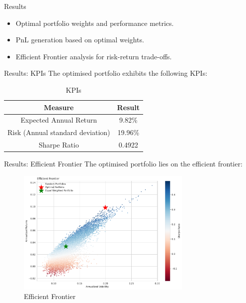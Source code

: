 \documentclass{beamer}
\begin{document}
\begin{frame}{Results}
  \begin{itemize}
    \item Optimal portfolio weights and performance metrics.
    \item PnL generation based on optimal weights.
    \item Efficient Frontier analysis for risk-return trade-offs.
  \end{itemize}
\end{frame}

\begin{frame}{Results: KPIs}
The optimised portfolio exhibits the following KPIs:
\begin{table}
    \centering
    \begin{tabular}{|c|c|}
        \hline
        \textbf{Measure} & \textbf{Result} \\ \hline %
        Expected Annual Return & 9.82\% \\ \hline %
        Risk (Annual standard deviation) & 19.96\% \\ \hline
        Sharpe Ratio & 0.4922 \\ \hline
    \end{tabular}
    \caption{KPIs}
    \label{table:tab1}
\end{table}
\end{frame}

\begin{frame}{Results: Efficient Frontier}
The optimised portfolio lies on the efficient frontier:
  \begin{figure}
    \centering
    \includegraphics[width=0.75\textwidth]{figure/Optimal_PF.pdf}
    \caption{Efficient Frontier}
  \end{figure}
\end{frame}
\end{document}
